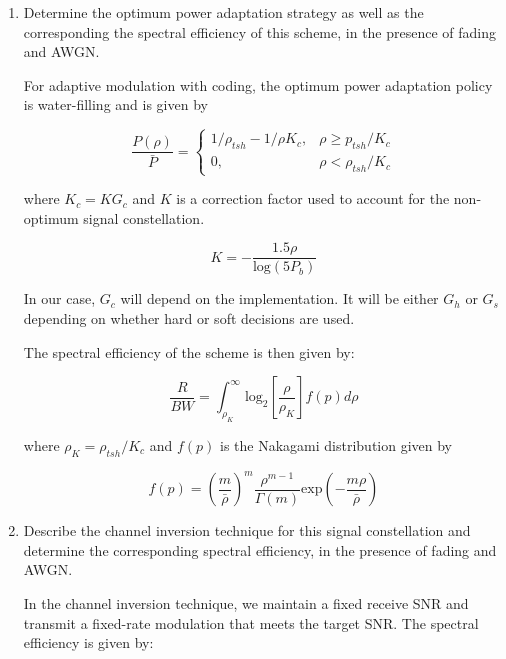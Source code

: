 \documentclass[fleqn]{article}
\begin{document}
\begin{enumerate}
\begin{enumerate}
			\item Determine the optimum power adaptation strategy as well as the corresponding the spectral efficiency of this scheme, in the presence of fading and AWGN.
			
			
			For adaptive modulation with coding, the optimum power adaptation policy is water-filling and is given by
			
			\begin{equation*}
				\frac{P(\rho)}{\bar{P}} = \begin{cases}
					1/\rho_{tsh} - 1/\rho K_c, & \rho \geq p_{tsh}/K_c\\
					0, & \rho < \rho_{tsh}/K_c
				\end{cases}
			\end{equation*}
			
			where $K_c = KG_c$ and $K$ is a correction factor used to account for the non-optimum signal constellation.
			
			\begin{equation*}
				K = -\frac{1.5\rho}{\text{log}(5P_b)}
			\end{equation*}
			
			In our case, $G_c$ will depend on the implementation. It will be either $G_h$ or $G_s$ depending on whether hard or soft decisions are used.
			 
			The spectral efficiency of the scheme is then given by:
			
			\begin{equation*}
				\frac{R}{BW} = \int_{\rho_K}^{\infty}{\text{log}_2\left[\frac{\rho}{\rho_K}\right]f(p)d\rho}
			\end{equation*}
			
			where $\rho_K = \rho_{tsh}/K_c$ and $f(p)$ is the Nakagami distribution given by
			
			\begin{equation*}
				f(p) = \left(\frac{m}{\bar{\rho}}\right)^m\frac{\rho^{m-1}}{\Gamma(m)}\text{exp}\left(-\frac{m\rho}{\bar{\rho}}\right)
			\end{equation*}
%			
			\item Describe the channel inversion technique for this signal constellation and determine the corresponding spectral efficiency, in the presence of fading and AWGN.
			
			In the channel inversion technique, we maintain a fixed receive SNR and transmit a fixed-rate modulation that meets the target SNR. The spectral efficiency is given by:
			

\end{enumerate}
\end{enumerate}
\end{document}
